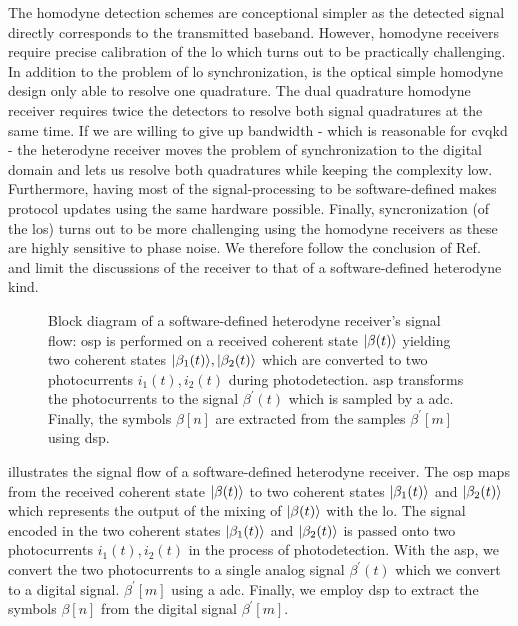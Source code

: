 The homodyne detection schemes are conceptional simpler as the detected signal directly corresponds to the transmitted baseband.
However, homodyne receivers require precise calibration of the \gls{lo} which turns out to be practically challenging.
In addition to the problem of \gls{lo} synchronization, is the optical simple homodyne design only able to resolve one quadrature.
The dual quadrature homodyne receiver requires twice the detectors to resolve both signal quadratures at the same time.
If we are willing to give up bandwidth - which is reasonable for \gls{cvqkd} - the heterodyne receiver moves the problem of synchronization to the digital domain and lets us resolve both quadratures while keeping the complexity low.
Furthermore, having most of the signal-processing to be software-defined makes protocol updates using the same hardware possible.
Finally, syncronization (of the \gls{lo}s) turns out to be more challenging using the homodyne receivers as these are highly sensitive to phase noise.
We therefore follow the conclusion of Ref.~\cite{Brunner2017} and limit the discussions of the receiver to that of a software-defined heterodyne kind.
\begin{figure}[htb]
	\centering
	
	\caption{Block diagram of a software-defined heterodyne receiver's signal flow: \gls{osp} is performed on a received coherent state $\lvert\beta(t)\rangle$ yielding two coherent states $\lvert\beta_1(t)\rangle,\lvert\beta_2(t)\rangle$ which are converted to two photocurrents $i_1(t),i_2(t)$ during photodetection. \gls{asp} transforms the photocurrents to the signal $\beta^\prime(t)$ which is sampled by a \gls{adc}. Finally, the symbols $\beta[n]$ are extracted from the samples $\beta^\prime[m]$ using \gls{dsp}.}\label{fig:receiver_signal_flow}
\end{figure}
 illustrates the signal flow of a software-defined heterodyne receiver.
The \gls{osp} maps from the received coherent state $\lvert\beta(t)\rangle$ to two coherent states $\lvert\beta_1(t)\rangle$ and $\lvert\beta_2(t)\rangle$ which represents the output of the mixing of $\lvert\beta(t)\rangle$ with the \gls{lo}.
The signal encoded in the two coherent states $\lvert\beta_1(t)\rangle$ and $\lvert\beta_2(t)\rangle$ is passed onto two photocurrents $i_1(t),i_2(t)$ in the process of photodetection.
With the \gls{asp}, we convert the two photocurrents to a single analog signal $\beta^\prime(t)$ which we convert to a digital signal. $\beta^\prime[m]$ using a \gls{adc}.
Finally, we employ \gls{dsp} to extract the symbols $\beta[n]$ from the digital signal $\beta^\prime[m]$.

